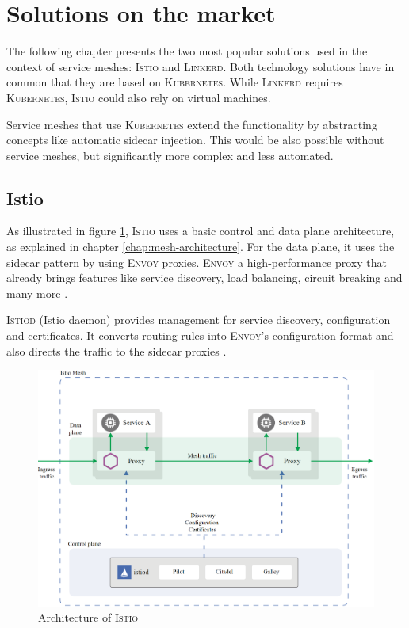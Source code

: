 \section{Solutions on the market}

The following chapter presents the two most popular solutions used in the context of service meshes: \textsc{Istio} and \textsc{Linkerd}. Both technology solutions have in common that they are based on \textsc{Kubernetes}. While \textsc{Linkerd} requires \textsc{Kubernetes}, \textsc{Istio} could also rely on virtual machines.

Service meshes that use \textsc{Kubernetes} extend the functionality by abstracting concepts like automatic sidecar injection. This would be also possible without service meshes, but significantly more complex and less automated.

\subsection{Istio}

As illustrated in figure \ref{fig:arch-istio}, \textsc{Istio} uses a basic control and data plane architecture, as explained in chapter \ref{chap:mesh-architecture}. For the data plane, it uses the sidecar pattern by using \textsc{Envoy} proxies. \textsc{Envoy} a high-performance proxy that already brings features like service discovery, load balancing, circuit breaking and many more \cite{istio-docs-arch}.

\textsc{Istiod} (Istio daemon) provides management for service discovery, configuration and certificates. It converts routing rules into \textsc{Envoy}'s configuration format and also directs the traffic to the sidecar proxies \cite{istio-docs-arch}.

\begin{figure}
    \includegraphics[width=\columnwidth]{img/istio_architecture.png}
    \caption{Architecture of \textsc{Istio} \cite{istio-docs-arch}}
    \label{fig:arch-istio}
\end{figure}

